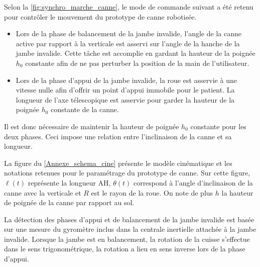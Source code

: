 Selon la \ref{fig:synchro_marche_canne}, le mode de commande suivant a été retenu pour contrôler le mouvement du prototype de canne robotisée.
\begin{itemize}
\item Lors de la phase de balancement de la jambe invalide, l'angle de la canne active par rapport à la verticale est asservi sur l'angle de la hanche de la jambe invalide. Cette tâche est accomplie en gardant la hauteur de la poignée $h_0$ constante afin de ne pas perturber la position de la main de l'utilisateur.

\item Lors de la phase d'appui de la jambe invalide, la roue est asservie à une vitesse nulle afin d'offrir un point d'appui immobile pour le patient. La longueur de l'axe télescopique est asservie pour garder la hauteur de la poignée $h_0$ constante de la canne.
\end{itemize}

Il est donc nécessaire de maintenir la hauteur de poignée $h_0$ constante pour les deux phases. Ceci impose une relation entre l'inclinaison de la canne et sa longueur.

La figure du \ref{Annexe_schema_cine} présente le modèle cinématique et les notations retenues pour le paramétrage du prototype de canne. Sur cette figure, $\ell(t)$ représente la longueur AH, $\theta(t)$ correspond à l'angle d'inclinaison de la canne avec la verticale et $R$ est le rayon de la roue. On note de plus $h$ la hauteur de poignée de la canne par rapport au sol.
\fi


\ifprof
{}
\fi

\ifprof
\else
La détection des phases d'appui et de balancement de la jambe invalide est basée sur une mesure du gyromètre inclus dans la centrale inertielle attachée à la jambe invalide. Lorsque la jambe est en balancement, la rotation de la cuisse s'effectue dans le sens trigonométrique, la rotation a lieu en sens inverse lors de la phase d'appui. 

